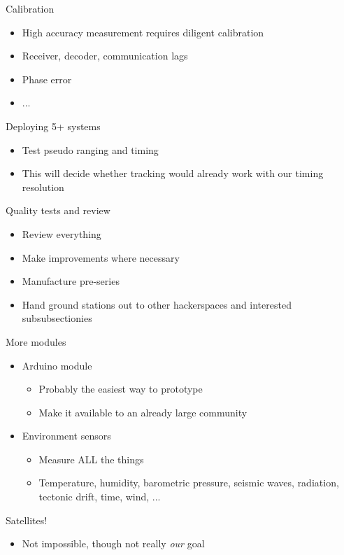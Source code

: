 	\begin{frame}{Calibration}
		\begin{itemize}
			\item High accuracy measurement requires diligent calibration
			\item Receiver, decoder, communication lags
			\item Phase error
			\item ...
		\end{itemize}
	\end{frame}
	\begin{frame}{Deploying 5+ systems}
		\begin{itemize}
			\item Test pseudo ranging and timing
			\item This will decide whether tracking would already work with our timing resolution
		\end{itemize}
	\end{frame}
	\begin{frame}{Quality tests and review}
		\begin{itemize}
			\item Review everything
			\item Make improvements where necessary
			\item Manufacture pre-series
			\item Hand ground stations out to other hackerspaces and interested subsubsectionies
		\end{itemize}
	\end{frame}
	\begin{frame}{More modules}
		\begin{itemize}
			\item Arduino module
			\begin{itemize}
				\item Probably the easiest way to prototype
				\item Make it available to an already large community
			\end{itemize}
			\item Environment sensors
			\begin{itemize}
				\item Measure ALL the things
				\item Temperature, humidity, barometric pressure, seismic waves, radiation, tectonic drift, time, wind, ...
			\end{itemize}
		\end{itemize}
	\end{frame}
	\begin{frame}{Satellites!}
		\begin{itemize}
			\item Not impossible, though not really \emph{our} goal
		\end{itemize}
	\end{frame}

